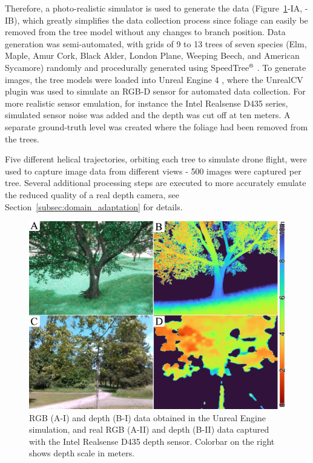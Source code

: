 Therefore, a photo-realistic simulator is used to generate the data (Figure~\ref{fig-3-sim-training}-IA, -IB), which greatly simplifies the data collection process since foliage can easily be removed from the tree model without any changes to branch position. Data generation was semi-automated, with grids of 9 to 13 trees of seven species (Elm, Maple, Amur Cork, Black Alder, London Plane, Weeping Beech, and American Sycamore) randomly and procedurally generated using SpeedTree$^\text{\textregistered}$ \cite{SpeedTree}. To generate images, the tree models were loaded into Unreal Engine 4 \cite{Unreal4.27}, where the UnrealCV plugin \cite{UnrealCV} was used to simulate an RGB-D sensor for automated data collection. For more realistic sensor emulation, for instance the Intel Realsense D435 series, simulated sensor noise was added \cite{Ahn2019AnalysisRobots} and the depth was cut off at ten meters. A separate ground-truth level was created where the foliage had been removed from the trees. 

Five different helical trajectories, orbiting each tree to simulate drone flight, were used to capture image data from different views - 500 images were captured per tree. Several additional processing steps are executed to more accurately emulate the reduced quality of a real depth camera, see Section~\ref{subsec:domain_adaptation} for details. 
\begin{figure}[!t]
\centering
\includegraphics[width=1\columnwidth]{chapters/papers/OBR/figures/fig-3-sim-training/fig-3-sim-training-v02.pdf}
\vspace{\figurevspaceabove}
\caption{RGB (A-I) and depth (B-I) data obtained in the Unreal Engine simulation, and real RGB (A-II) and depth (B-II) data captured with the Intel Realsense D435 depth sensor. Colorbar on the right shows depth scale in meters.}
\label{fig-3-sim-training}
\vspace{\figurevspacebelow}
\end{figure}

